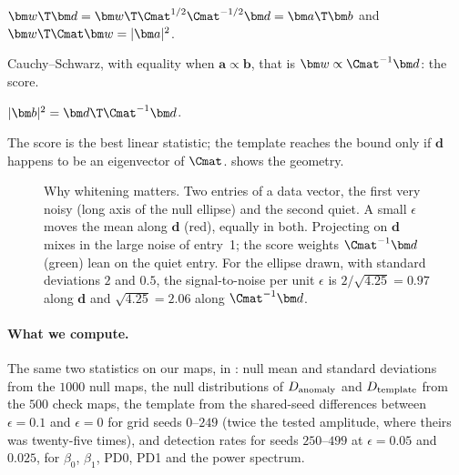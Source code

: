 \begin{explain}
  \item $\bm w\T\bm d=\bm w\T\Cmat^{1/2}\Cmat^{-1/2}\bm d=\bm a\T\bm b$ and $\bm w\T\Cmat\bm w=|\bm a|^2$.
  \item Cauchy--Schwarz, with equality when $\bm a\propto\bm b$, that is $\bm w\propto\Cmat^{-1}\bm d$: the score.
  \item $|\bm b|^2=\bm d\T\Cmat^{-1}\bm d$.
\end{explain}
The score is the best linear statistic; the template reaches the bound only if $\bm d$ happens to be an eigenvector of $\Cmat$.
 shows the geometry.

\begin{figure}[htbp]
\centering
{}
\caption{Why whitening matters. Two entries of a data vector, the first very noisy (long axis of the null ellipse) and the second quiet. A small
$\epsilon$ moves the mean along $\bm d$ (red), equally in both. Projecting on $\bm d$ mixes in the large noise of entry~1; the score weights
$\Cmat^{-1}\bm d$ (green) lean on the quiet entry. For the ellipse drawn, with standard deviations $2$ and $0.5$, the signal-to-noise per unit
$\epsilon$ is $2/\sqrt{4.25}=0.97$ along $\bm d$ and $\sqrt{4.25}=2.06$ along $\Cmat^{-1}\bm d$.}
\label{12c:fig:whiten}
\end{figure}

\paragraph{What we compute.} The same two statistics on our maps, in : null mean and standard deviations from the
$1000$ null maps, the null distributions of $D_{\rm anomaly}$ and $D_{\rm template}$ from the $500$ check maps, the template from the shared-seed
differences between $\epsilon=0.1$ and $\epsilon=0$ for grid seeds $0$--$249$ (twice the tested amplitude, where theirs was twenty-five times), and
detection rates for seeds $250$--$499$ at $\epsilon=0.05$ and $0.025$, for $\beta_0$, $\beta_1$, PD0, PD1 and the power spectrum.

